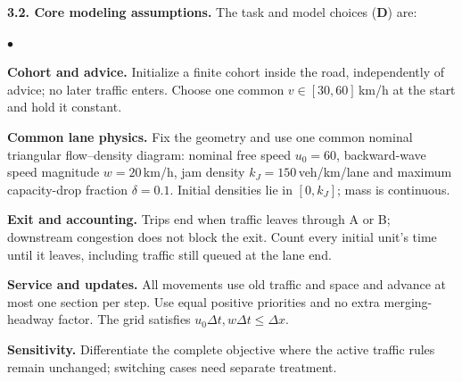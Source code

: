 \documentclass[10pt,a4paper]{article}
\newcommand{\Own}[1]{\textcolor{Own}{#1}}
\newcommand{\relD}{\textbf{\textsf{D}}}
\newenvironment{points}{\begin{list}{$\bullet$}{%
 \setlength{\leftmargin}{1.3em}\setlength{\labelwidth}{0.6em}%
 \setlength{\labelsep}{0.4em}\setlength{\itemsep}{2pt}%
 \setlength{\parsep}{0pt}\setlength{\topsep}{2pt}}}{\end{list}}
\begin{document}
\textbf{3.2. Core modeling assumptions.}
\Own{The task and model choices (\relD)} are:
\begin{points}
\item \textbf{Cohort and advice.} Initialize a finite cohort inside the road,
independently of advice; no later traffic enters. Choose one common
$v\in[30,60]$\,km/h at the start and hold it constant.
\item \textbf{Common lane physics.} Fix the geometry and use one common
nominal triangular flow--density diagram:
nominal free speed $u_0=60$, backward-wave speed magnitude $w=20$\,km/h,
jam density $k_J=150$\,veh/km/lane and maximum capacity-drop fraction
$\delta=0.1$. Initial densities lie in $[0,k_J]$; mass is continuous.
\item \textbf{Exit and accounting.} Trips end when traffic leaves through A
or B; downstream congestion does not block the exit. Count every initial
unit's time until it leaves, including traffic still queued at the lane end.
\item \textbf{Service and updates.} All movements use old traffic and space
and advance at most one section per step. Use equal positive priorities
and no extra merging-headway factor. The grid satisfies
$u_0\Delta t,w\Delta t\leq\Delta x$.
\item \textbf{Sensitivity.} Differentiate the complete objective where the
active traffic rules remain unchanged; switching cases need separate treatment.
\end{points}
\end{document}
